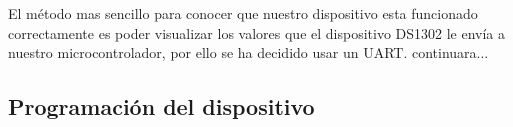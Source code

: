 \documentclass[10pt,a4paper,oneside]{article}
\begin{document}
El método mas sencillo para conocer que nuestro dispositivo esta funcionado correctamente es poder visualizar los valores que el dispositivo DS1302 le envía a nuestro microcontrolador, por ello se ha decidido usar un UART. continuara...  


\subsection{Programación del dispositivo}%


\bigskip
\end{document}
